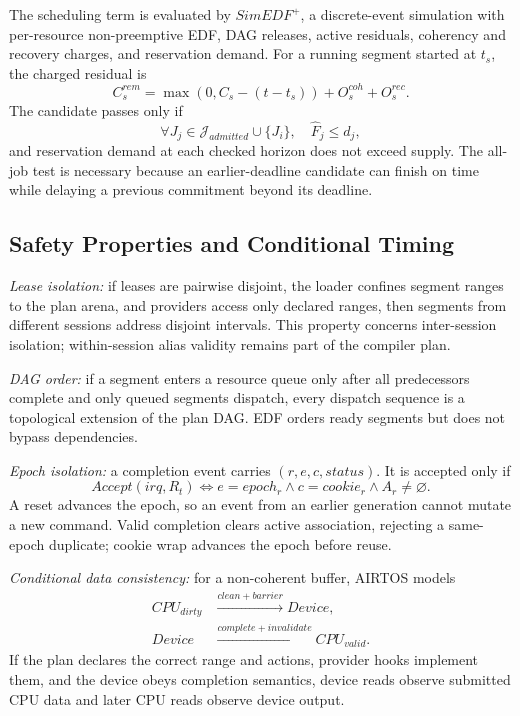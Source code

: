 \documentclass[lettersize,journal]{IEEEtran}
\begin{document}
The scheduling term is evaluated by $SimEDF^+$, a discrete-event simulation
with per-resource non-preemptive EDF, DAG releases, active residuals,
coherency and recovery charges, and reservation demand. For a running segment
started at $t_s$, the charged residual is
\begin{equation}
C_s^{rem}=\max(0,C_s-(t-t_s))+O_s^{coh}+O_s^{rec}.
\end{equation}
The candidate passes only if
\begin{equation}
\forall J_j\in\mathcal J_{admitted}\cup\{J_i\},\quad
\widehat F_j\le d_j,
\label{eq:alljobs}
\end{equation}
and reservation demand at each checked horizon does not exceed supply. The
all-job test is necessary because an earlier-deadline candidate can finish on
time while delaying a previous commitment beyond its deadline.

\subsection{Safety Properties and Conditional Timing}
\textit{Lease isolation:} if leases are pairwise disjoint, the loader confines
segment ranges to the plan arena, and providers access only declared ranges,
then segments from different sessions address disjoint intervals. This property
concerns inter-session isolation; within-session alias validity remains part of
the compiler plan.

\textit{DAG order:} if a segment enters a resource queue only after all
predecessors complete and only queued segments dispatch, every dispatch
sequence is a topological extension of the plan DAG. EDF orders ready segments
but does not bypass dependencies.

\textit{Epoch isolation:} a completion event carries $(r,e,c,status)$. It is
accepted only if
\begin{equation}
Accept(irq,R_t)\Leftrightarrow e=epoch_r\land c=cookie_r
\land A_r\ne\varnothing.
\label{eq:accept}
\end{equation}
A reset advances the epoch, so an event from an earlier generation cannot
mutate a new command. Valid completion clears active association, rejecting a
same-epoch duplicate; cookie wrap advances the epoch before reuse.

\textit{Conditional data consistency:} for a non-coherent buffer, AIRTOS
models
\begin{equation}
\begin{aligned}
CPU_{dirty}&\xrightarrow{clean+barrier}Device,\\
Device&\xrightarrow{complete+invalidate}CPU_{valid}.
\end{aligned}
\end{equation}
If the plan declares the correct range and actions, provider hooks implement
them, and the device obeys completion semantics, device reads observe submitted
CPU data and later CPU reads observe device output.
\end{document}
